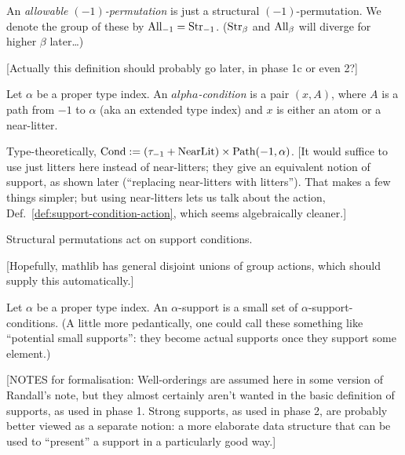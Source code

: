 \begin{definition}
  \label{def:allowable-perm-atoms}
  An \emph{allowable $(-1)$-permutation} is just a structural $(-1)$-permutation. We denote the group of these by $\mathrm{All}_{-1} = \mathrm{Str}_{-1}$.  ($\mathrm{Str}_\beta$ and $\mathrm{All}_\beta$ will diverge for higher $\beta$ later…)

  [Actually this definition should probably go later, in phase 1c or even 2?]
\end{definition}

\begin{definition}
  \label{def:support-condition}
  \leanok
  Let $\alpha$ be a proper type index. An \emph{$alpha$-condition} is a pair $(x,A)$, where $A$ is a path from $-1$ to $\alpha$ (aka an extended type index) and $x$ is either an atom or a near-litter.

  Type-theoretically, $\mathrm{Cond} := (\tau_{-1} + \mathrm{NearLit}) \times \mathrm{Path}(-1,\alpha)$.
  [It would suffice to use just litters here instead of near-litters; they give an equivalent notion of support, as shown later (“replacing near-litters with litters”).  That makes a few things simpler; but using near-litters lets us talk about the action, Def.~\ref{def:support-condition-action}, which seems algebraically cleaner.]
\end{definition}

\begin{definition}
  \label{def:support-condition-action}

  Structural permutations act on support conditions.

  [Hopefully, mathlib has general disjoint unions of group actions, which should supply this automatically.]
\end{definition}

\begin{definition}
\label{def:support}
\leanok
Let $\alpha$ be a proper type index. An $\alpha$-support is a small set of $\alpha$-support-conditions.  (A little more pedantically, one could call these something like “potential small supports”: they become actual supports once they support some element.)

[NOTES for formalisation: Well-orderings are assumed here in some version of Randall’s note, but they almost certainly aren’t wanted in the basic definition of supports, as used in phase 1. Strong supports, as used in phase 2, are probably better viewed as a separate notion: a more elaborate data structure that can be used to “present” a support in a particularly good way.]
\end{definition}

